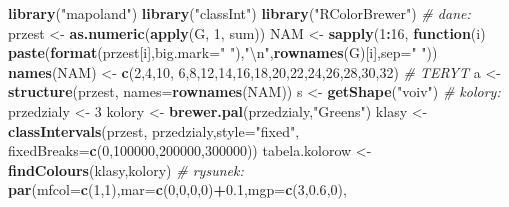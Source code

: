 \documentclass[polish,]{book}
\newenvironment{Shaded}{\begin{snugshade}}{\end{snugshade}}
\newcommand{\CharTok}[1]{\textcolor[rgb]{0.31,0.60,0.02}{#1}}
\newcommand{\CommentTok}[1]{\textcolor[rgb]{0.56,0.35,0.01}{\textit{#1}}}
\newcommand{\ControlFlowTok}[1]{\textcolor[rgb]{0.13,0.29,0.53}{\textbf{#1}}}
\newcommand{\DataTypeTok}[1]{\textcolor[rgb]{0.13,0.29,0.53}{#1}}
\newcommand{\DecValTok}[1]{\textcolor[rgb]{0.00,0.00,0.81}{#1}}
\newcommand{\FloatTok}[1]{\textcolor[rgb]{0.00,0.00,0.81}{#1}}
\newcommand{\KeywordTok}[1]{\textcolor[rgb]{0.13,0.29,0.53}{\textbf{#1}}}
\newcommand{\NormalTok}[1]{#1}
\newcommand{\OperatorTok}[1]{\textcolor[rgb]{0.81,0.36,0.00}{\textbf{#1}}}
\newcommand{\StringTok}[1]{\textcolor[rgb]{0.31,0.60,0.02}{#1}}
\begin{document}
\begin{Shaded}
\begin{Highlighting}[]
\KeywordTok{library}\NormalTok{(}\StringTok{"mapoland"}\NormalTok{)}
\KeywordTok{library}\NormalTok{(}\StringTok{"classInt"}\NormalTok{)}
\KeywordTok{library}\NormalTok{(}\StringTok{"RColorBrewer"}\NormalTok{)}
\CommentTok{# dane:}
\NormalTok{przest <-}\StringTok{ }\KeywordTok{as.numeric}\NormalTok{(}\KeywordTok{apply}\NormalTok{(G, }\DecValTok{1}\NormalTok{, sum))}
\NormalTok{NAM <-}\StringTok{ }\KeywordTok{sapply}\NormalTok{(}\DecValTok{1}\OperatorTok{:}\DecValTok{16}\NormalTok{,}
              \ControlFlowTok{function}\NormalTok{(i) }\KeywordTok{paste}\NormalTok{(}\KeywordTok{format}\NormalTok{(przest[i],}\DataTypeTok{big.mark=}\StringTok{" "}\NormalTok{),}\StringTok{"}\CharTok{\textbackslash{}n}\StringTok{"}\NormalTok{,}\KeywordTok{rownames}\NormalTok{(G)[i],}\DataTypeTok{sep=}\StringTok{" "}\NormalTok{))}
\KeywordTok{names}\NormalTok{(NAM) <-}\StringTok{ }\KeywordTok{c}\NormalTok{(}\DecValTok{2}\NormalTok{,}\DecValTok{4}\NormalTok{,}\DecValTok{10}\NormalTok{, }\DecValTok{6}\NormalTok{,}\DecValTok{8}\NormalTok{,}\DecValTok{12}\NormalTok{,}\DecValTok{14}\NormalTok{,}\DecValTok{16}\NormalTok{,}\DecValTok{18}\NormalTok{,}\DecValTok{20}\NormalTok{,}\DecValTok{22}\NormalTok{,}\DecValTok{24}\NormalTok{,}\DecValTok{26}\NormalTok{,}\DecValTok{28}\NormalTok{,}\DecValTok{30}\NormalTok{,}\DecValTok{32}\NormalTok{) }\CommentTok{# TERYT}
\NormalTok{a <-}\StringTok{ }\KeywordTok{structure}\NormalTok{(przest, }\DataTypeTok{names=}\KeywordTok{rownames}\NormalTok{(NAM))}
\NormalTok{s <-}\StringTok{ }\KeywordTok{getShape}\NormalTok{(}\StringTok{"voiv"}\NormalTok{)}
\CommentTok{# kolory:}
\NormalTok{przedzialy <-}\StringTok{ }\DecValTok{3}
\NormalTok{kolory <-}\StringTok{ }\KeywordTok{brewer.pal}\NormalTok{(przedzialy,}\StringTok{"Greens"}\NormalTok{)}
\NormalTok{klasy <-}\StringTok{ }\KeywordTok{classIntervals}\NormalTok{(przest, przedzialy,}\DataTypeTok{style=}\StringTok{"fixed"}\NormalTok{,}
                        \DataTypeTok{fixedBreaks=}\KeywordTok{c}\NormalTok{(}\DecValTok{0}\NormalTok{,}\DecValTok{100000}\NormalTok{,}\DecValTok{200000}\NormalTok{,}\DecValTok{300000}\NormalTok{))}
\NormalTok{tabela.kolorow <-}\StringTok{ }\KeywordTok{findColours}\NormalTok{(klasy,kolory)}
\CommentTok{# rysunek:}
\KeywordTok{par}\NormalTok{(}\DataTypeTok{mfcol=}\KeywordTok{c}\NormalTok{(}\DecValTok{1}\NormalTok{,}\DecValTok{1}\NormalTok{),}\DataTypeTok{mar=}\KeywordTok{c}\NormalTok{(}\DecValTok{0}\NormalTok{,}\DecValTok{0}\NormalTok{,}\DecValTok{0}\NormalTok{,}\DecValTok{0}\NormalTok{)}\OperatorTok{+}\FloatTok{0.1}\NormalTok{,}\DataTypeTok{mgp=}\KeywordTok{c}\NormalTok{(}\DecValTok{3}\NormalTok{,}\FloatTok{0.6}\NormalTok{,}\DecValTok{0}\NormalTok{),}

\end{Highlighting}
\end{Shaded}
\end{document}
